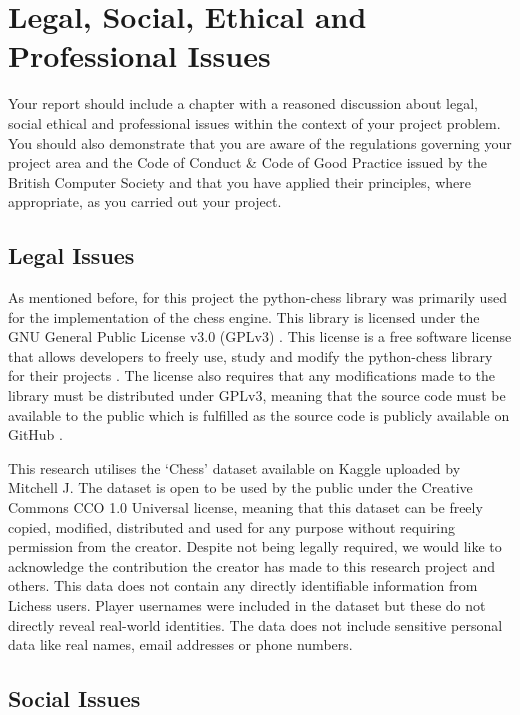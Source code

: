 \chapter{Legal, Social, Ethical and Professional Issues}
Your report should include a chapter with a reasoned discussion about legal, social ethical and professional issues within the context of your project problem. You should also demonstrate that you are aware of the regulations governing your project area and the Code of Conduct \& Code of Good Practice issued by the British Computer Society and that you have applied their principles, where appropriate, as you carried out your project.

\section{Legal Issues}

As mentioned before, for this project the python-chess library was primarily used for the implementation of the chess engine. This library is licensed under the GNU General Public License v3.0 (GPLv3) \cite{PythonchessPurePython}. This license is a free software license that allows developers to freely use, study and modify the python-chess library for their projects \cite{GNUGeneralPublic}. The license also requires that any modifications made to the library must be distributed under GPLv3, meaning that the source code must be available to the public which is fulfilled as the source code is publicly available on GitHub \cite{fiekasNiklasfPythonchess2025}. 

This research utilises the `Chess' dataset available on Kaggle \cite{ChessGameDataset} uploaded by Mitchell J. The dataset is open to be used by the public under the Creative Commons CCO 1.0 Universal license, meaning that this dataset can be freely copied, modified, distributed and used for any purpose without requiring permission from the creator. Despite not being legally required, we would like to acknowledge the contribution the creator has made to this research project and others. This data does not contain any directly identifiable information from Lichess users. Player usernames were included in the dataset but these do not directly reveal real-world identities. The data does not include sensitive personal data like real names, email addresses or phone numbers.

\section{Social Issues}


